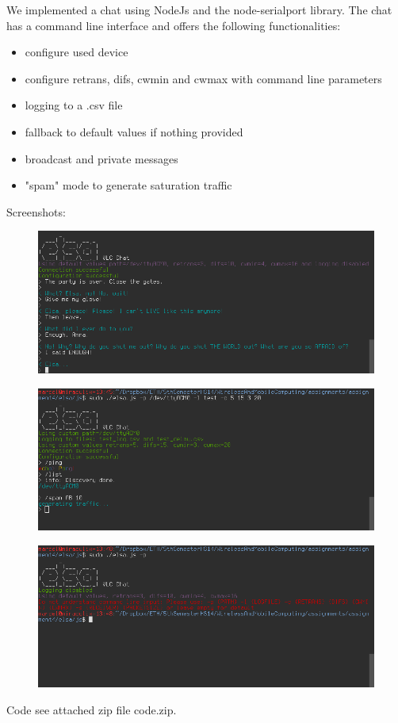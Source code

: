 We implemented a chat using NodeJs and the node-serialport library.
The chat has a command line interface and offers the following functionalities:
\begin{itemize}

  \item configure used device
  \item configure retrans, difs, cwmin and cwmax with command line parameters
  \item logging to a .csv file
  \item fallback to default values if nothing provided
  \item broadcast and private messages
  \item "spam" mode to generate saturation traffic
\end{itemize}
Screenshots:
\begin{figure}[htp]
\centering
\includegraphics[width=\textwidth]{../img/elsa_1.png}
\caption{}
\label{}
\end{figure}
\begin{figure}[htp]
\centering
\includegraphics[width=\textwidth]{../img/elsa_2.png}
\caption{}
\label{}
\end{figure}
\begin{figure}[htp]
\centering
\includegraphics[width=\textwidth]{../img/elsa_3.png}
\caption{}
\label{}
\end{figure}

Code see attached zip file code.zip.